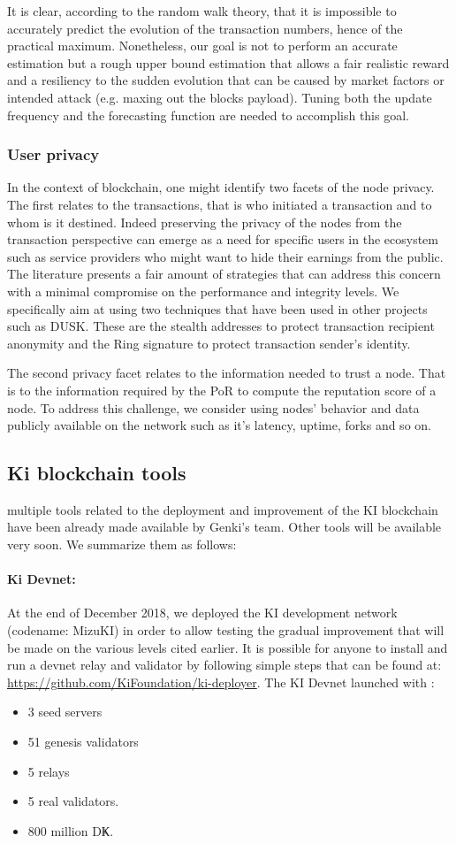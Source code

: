 It is clear, according to the random walk theory, that it is impossible to accurately predict the evolution of the transaction numbers, hence of the practical maximum. Nonetheless, our goal is not to perform an accurate estimation but a rough upper bound estimation that allows a fair realistic reward and a resiliency to the sudden evolution that can be caused by market factors or intended attack (e.g. maxing out the blocks payload). Tuning both the update frequency and the forecasting function are needed to accomplish this goal.

\subsubsection{User privacy}
In the context of blockchain, one might identify two facets of the node privacy. The first relates to the transactions, that is who initiated a transaction and to whom is it destined. Indeed preserving the privacy of the nodes from the transaction perspective can emerge as a need for specific users in the ecosystem such as service providers who might want to hide their earnings from the public. The literature presents a fair amount of strategies that can address this concern with a minimal compromise on the performance and integrity levels. We specifically aim at using two techniques that have been used in other projects such as DUSK. These are the stealth addresses to protect transaction recipient anonymity and the Ring signature to protect transaction sender’s identity.

The second privacy facet relates to the information needed to trust a node. That is to the information required by the PoR to compute the reputation score of a node. To address this challenge, we consider using nodes' behavior and data publicly available on the network such as it's latency, uptime, forks and so on. 

\subsection{Ki blockchain tools}
multiple tools related to the deployment and improvement of the KI blockchain have been already made available by Genki’s team. Other tools will be available very soon. We summarize them as follows: 
\paragraph{Ki Devnet: }At the end of December 2018, we deployed the KI development network (codename: MizuKI) in order to allow testing the gradual improvement that will be made on the various levels cited earlier. It is possible for anyone to install and run a devnet relay and validator by following simple steps that can be found at: \url{https://github.com/KiFoundation/ki-deployer}. The KI Devnet launched with : 
\begin{itemize}
\item 3 seed servers 
\item 51 genesis validators 
\item 5 relays 
\item 5 real validators. 
\item 800 million DҜ. 
\end{itemize}

